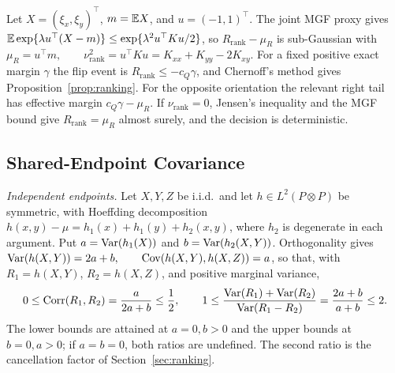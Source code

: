 Let $X=(\xi_x,\xi_y)^\top$, $m=\mathbb{E} X$, and $u=(-1,1)^\top$. The joint MGF proxy gives
$\mathbb{E}\exp\{\lambda u^\top(X-m)\}\le\exp\{\lambda^2u^\top Ku/2\}$,
so $R_{\mathrm{rank}}-\mu_R$ is sub-Gaussian with
$\mu_R=u^\top m,\qquad \nu_{\mathrm{rank}}^2=u^\top Ku=K_{xx}+K_{yy}-2K_{xy}$.
For a fixed positive exact margin $\gamma$ the flip event is $R_{\mathrm{rank}}\le-c_Q\gamma$, and Chernoff's method gives Proposition~\ref{prop:ranking}. For the opposite orientation the relevant right tail has effective margin $c_Q\gamma-\mu_R$. If $\nu_{\mathrm{rank}}=0$, Jensen's inequality and the MGF bound give $R_{\mathrm{rank}}=\mu_R$ almost surely, and the decision is deterministic.

\subsection{Shared-Endpoint Covariance}
\label{app:p2p3}

\noindent\emph{Independent endpoints.}\quad
Let $X,Y,Z$ be i.i.d.\ and let $h\in L^2(P\otimes P)$ be symmetric, with Hoeffding decomposition
$h(x,y)-\mu=h_1(x)+h_1(y)+h_2(x,y)$,
where $h_2$ is degenerate in each argument. Put $a=\operatorname{Var}(h_1(X))$ and $b=\operatorname{Var}(h_2(X,Y))$. Orthogonality gives
$\operatorname{Var}(h(X,Y))=2a+b,\qquad\operatorname{Cov}(h(X,Y),h(X,Z))=a$,
so that, with $R_1=h(X,Y)$, $R_2=h(X,Z)$, and positive marginal variance,
\begin{equation}
0\le\operatorname{Corr}(R_1,R_2)=\frac{a}{2a+b}\le\frac12,
\qquad
1\le\frac{\operatorname{Var}(R_1)+\operatorname{Var}(R_2)}{\operatorname{Var}(R_1-R_2)}=\frac{2a+b}{a+b}\le2.
\label{eq:app-iid-half}
\end{equation}
The lower bounds are attained at $a=0,b>0$ and the upper bounds at $b=0,a>0$; if $a=b=0$, both ratios are undefined. The second ratio is the cancellation factor of Section~\ref{sec:ranking}.

